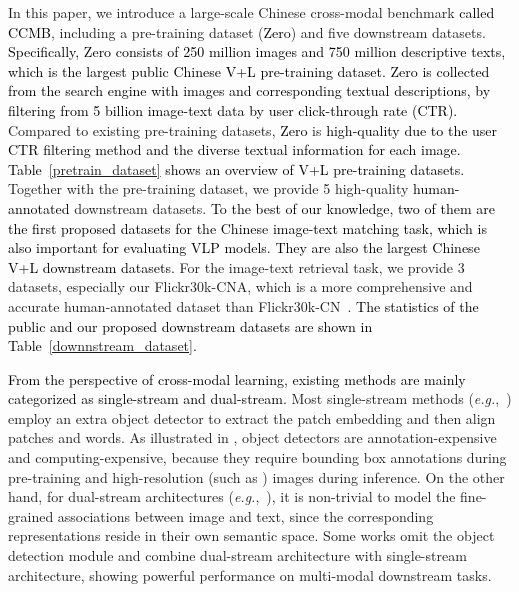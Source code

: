 \documentclass[sigconf]{acmart}
\def\eg{\mbox{\textit{e.g.}, }}
\def\blue{\textcolor{black}}
\def\ldw{\textcolor{black}}
\def\mmxie{\textcolor{black}}
\def\mmcr{\textcolor{black}}
\begin{document}
In this paper, we introduce a large-scale Chinese cross-modal benchmark \blue{called CCMB}, including a pre-training dataset (\mmcr{Zero}) and five downstream datasets.
\blue{Specifically, \mmcr{Zero} consists of 250 million images and 750 million descriptive texts, which is the largest public Chinese V+L pre-training dataset. \mmcr{Zero} is collected from the search engine with images and corresponding textual descriptions, by filtering from 5 billion image-text data by user click-through rate (CTR).}
Compared to existing pre-training datasets, \mmcr{Zero} is \ldw{high-quality due to the user CTR filtering method and the diverse textual information for each image.} \blue{Table~\ref{pretrain_dataset} shows an overview of V+L pre-training datasets.}
Together with the pre-training dataset, we provide 5 high-quality \blue{human-annotated} downstream datasets.
\mmxie{To the best of our knowledge, two of them are the first proposed datasets for the Chinese image-text matching task, which is also important for evaluating VLP models. They are also the largest Chinese V+L downstream datasets.}
For the image-text retrieval task, we provide 3 datasets, 
especially our Flickr30k-CNA, which is a more comprehensive and accurate human-annotated dataset than Flickr30k-CN~\cite{flickr30k-cn}. \blue{The statistics of the public and our proposed downstream datasets are shown in Table~\ref{downnstream_dataset}.}







\mmxie{From the perspective of cross-modal learning, existing methods are mainly categorized as single-stream and dual-stream.} Most single-stream methods (\eg \cite{uniter,UNIMO,imagebert}) employ an extra object detector to extract the patch embedding and then align patches and words. As illustrated in \cite{ALBEF}, object detectors are annotation-expensive and computing-expensive, because they require bounding box annotations during pre-training and high-resolution (such as ) images during inference.
On the other hand, for dual-stream architectures (\eg \cite{CLIP,ALIGN,wenlan2}), it is non-trivial to model the fine-grained associations between image and text, since the corresponding representations reside in their own semantic space. 
Some works \cite{BLIP,ALBEF,FLAVA} omit the object detection module and combine dual-stream architecture with single-stream architecture, showing powerful performance on multi-modal downstream tasks.
\end{document}

